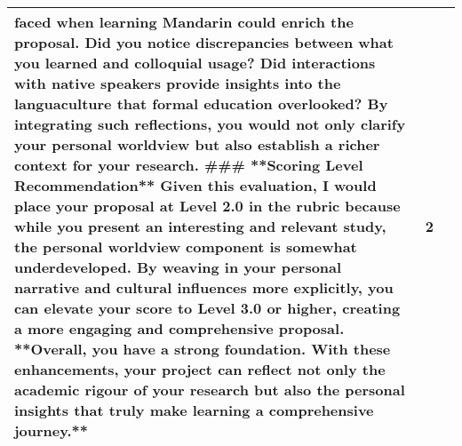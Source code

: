 \begin{longtable}{|p{}|p{}|p{}|}
faced when learning Mandarin could enrich the proposal. Did you notice discrepancies between what you learned and colloquial usage? Did interactions with native speakers provide insights into the languaculture that formal education overlooked? By integrating such reflections, you would not only clarify your personal worldview but also establish a richer context for your research.  \#\#\# **Scoring Level Recommendation** Given this evaluation, I would place your proposal at Level 2.0 in the rubric because while you present an interesting and relevant study, the personal worldview component is somewhat underdeveloped. By weaving in your personal narrative and cultural influences more explicitly, you can elevate your score to Level 3.0 or higher, creating a more engaging and comprehensive proposal.  **Overall, you have a strong foundation. With these enhancements, your project can reflect not only the academic rigour of your research but also the personal insights that truly make learning a comprehensive journey.** & 2 \\
\hline

\end{longtable}
